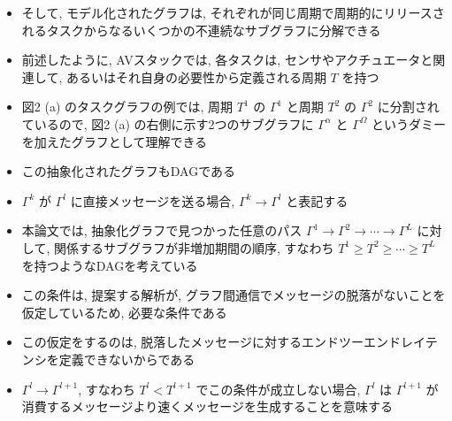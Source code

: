 \begin{frame}{}
    \begin{itemize}
        \item そして, モデル化されたグラフは, それぞれが同じ周期で周期的にリリースされるタスクからなるいくつかの不連続なサブグラフに分解できる
        \item 前述したように, AVスタックでは, 各タスクは, センサやアクチュエータと関連して, あるいはそれ自身の必要性から定義される周期 $T$ を持つ
        \item 図2 (a) のタスクグラフの例では, 周期 $T^{1}$ の $\Gamma^{1}$ と周期 $T^{2}$ の $\Gamma^{2}$ に分割されているので, 図2 (a) の右側に示す2つのサブグラフに $\Gamma^{\alpha}$ と $\Gamma^{\Omega}$ というダミーを加えたグラフとして理解できる
        \item この抽象化されたグラフもDAGである
        \item $\Gamma^{k}$ が $\Gamma^{l}$ に直接メッセージを送る場合, $\Gamma^{k} \rightarrow \Gamma^{l}$ と表記する
    \end{itemize}
\end{frame}

\begin{frame}{}
    \begin{itemize}
        \item 本論文では, 抽象化グラフで見つかった任意のパス $\Gamma^{1} \rightarrow \Gamma^{2} \rightarrow \cdots \rightarrow \Gamma^{L}$ に対して, 関係するサブグラフが非増加期間の順序, すなわち $T^{1} \geq T^{2} \geq \cdots \geq T^{L}$ を持つようなDAGを考えている
        \item この条件は, 提案する解析が, グラフ間通信でメッセージの脱落がないことを仮定しているため, 必要な条件である
        \item この仮定をするのは, 脱落したメッセージに対するエンドツーエンドレイテンシを定義できないからである
        \item $\Gamma^{l} \rightarrow \Gamma^{l+1}$, すなわち $T^{l}<T^{l+1}$ でこの条件が成立しない場合, $\Gamma^{l}$ は $\Gamma^{l+1}$ が消費するメッセージより速くメッセージを生成することを意味する
    \end{itemize}
\end{frame}


